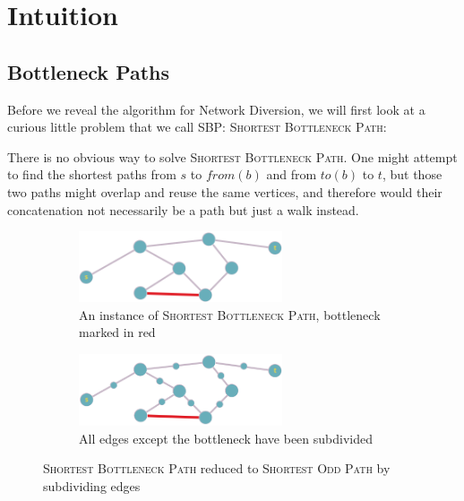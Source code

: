 \section{Intuition}
\subsection{Bottleneck Paths}
\label{section:subdividing-bottlenecks}
Before we reveal the algorithm for Network Diversion, we will first look at a curious little problem that we call \textsc{SBP: Shortest Bottleneck Path}:


There is no obvious way to solve \textsc{Shortest Bottleneck Path}. One might attempt to find the shortest paths from $s$ to $from(b)$ and from $to(b)$ to $t$, but those two paths might overlap and reuse the same vertices, and therefore would their concatenation not necessarily be a path but just a walk instead.

\begin{figure}
    \centering
    \begin{subfigure}{.45\textwidth}
        \centering
        \includegraphics[width=6cm]{figures/bottleneck.png}
        \caption{An instance of \textsc{Shortest Bottleneck Path}, bottleneck marked in red}
        \label{figure:bottleneck}
    \end{subfigure}\hfill%
    \begin{subfigure}{.45\textwidth}
        \centering
        \includegraphics[width=6cm]{figures/subdivide-bottleneck.png}
        \caption{All edges except the bottleneck have been subdivided}
        \label{figure:subdivided-bottleneck}
    \end{subfigure}%
    \caption{\textsc{Shortest Bottleneck Path} reduced to \textsc{Shortest Odd Path} by subdividing edges}
    \label{figure:bottleneck-subdividing}
\end{figure}

